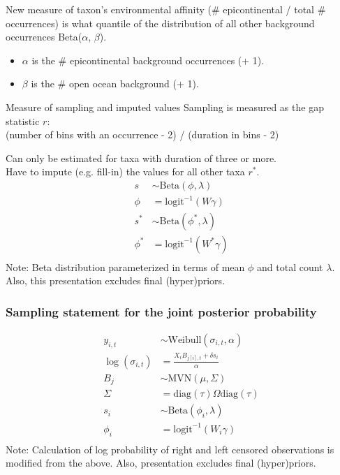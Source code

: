 \documentclass{beamer}
\begin{document}
\begin{frame}
  \begin{block}{New measure of taxon's environmental affinity}
    (\# epicontinental / total \# occurrences) is what quantile of the distribution of all other background occurrences Beta(\(\alpha\), \(\beta\)).
    \begin{itemize}
      \item \(\alpha\) is the \# epicontinental background occurrences (+ 1).
      \item \(\beta\) is the \# open ocean background (+ 1).
    \end{itemize}
  \end{block}
\end{frame}

\begin{frame}
  \begin{block}{Measure of sampling and imputed values}
    Sampling is measured as the gap statistic \(r\): \\(number of bins with an occurrence - 2) / (duration in bins - 2)

    Can only be estimated for taxa with duration of three or more. \\Have to impute (e.g. fill-in) the values for all other taxa \(r^{\ast}\).
    \begin{align*}
      s &\sim \text{Beta}(\phi, \lambda) \\
      \phi &= \text{logit}^{-1}(W\gamma) \\
      s^{\ast} &\sim \text{Beta}(\phi^{\ast}, \lambda) \\
      \phi^{\ast} &= \text{logit}^{-1}(W^{\ast}\gamma) \\
    \end{align*}
    \scriptsize{Note: Beta distribution parameterized in terms of mean \(\phi\) and total count \(\lambda\). \\Also, this presentation excludes final (hyper)priors.}
  \end{block}
\end{frame}

\begin{frame}
  \frametitle{Sampling statement for the joint posterior probability}

  \small{
    \begin{align*}
      y_{i, t} &\sim \text{Weibull}(\sigma_{i, t}, \alpha) \\
      \log(\sigma_{i, t}) &= \frac{X_{i}B_{j[i], t} + \delta s_{i}}{\alpha} \\
      B_{j} &\sim \text{MVN}(\mu, \Sigma) \\
      \Sigma &= \text{diag}(\tau) \Omega \text{diag}(\tau) \\
      s_{i} &\sim \text{Beta}(\phi_{i}, \lambda) \\
      \phi_{i} &= \text{logit}^{-1}(W_{i}\gamma) \\
    \end{align*}
  }
  \scriptsize{Note: Calculation of log probability of right and left censored observations is modified from the above. Also, presentation excludes final (hyper)priors.}
\end{frame}
\end{document}
